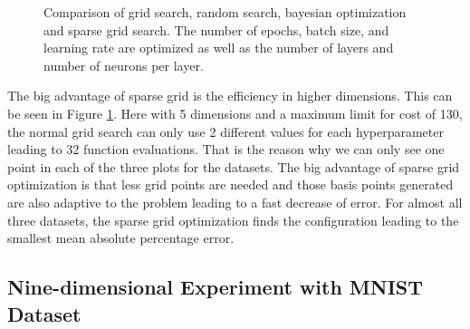 \begin{figure}[htb!]
	\caption{  Comparison of grid search, random search, bayesian optimization and sparse grid search. The number of epochs, batch size, and learning rate are optimized as well as the number of layers and number of neurons per layer. }	
	\label{fig:result_second_comparison_dim5}
\end{figure}


The big advantage of sparse grid is the efficiency in higher dimensions. This can be seen in Figure \ref{fig:result_second_comparison_dim5}. Here with 5 dimensions and a maximum limit for cost of 130, the normal grid search can only use 2 different values for each hyperparameter leading to 32 function evaluations. That is the reason why we can only see one point in each of the three plots for the datasets. The big advantage of sparse grid optimization is that less grid points are needed and those basis points generated are also adaptive to the problem leading to a fast decrease of error. For almost all three datasets, the sparse grid optimization finds the configuration leading to the smallest mean absolute percentage error. 


\subsection{Nine-dimensional Experiment with MNIST Dataset}



